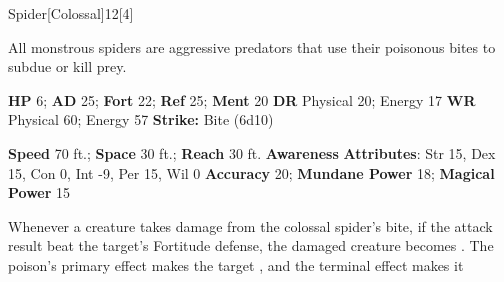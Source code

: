   
  \begin{monsection}{Spider}[Colossal]{12}[4]
    \vspace{-1em}\vspace{-1em}
    \vspace{0em}

    
    All monstrous spiders are aggressive predators that use their poisonous bites to subdue or kill prey.
  

    \begin{spellcontent}
      \begin{spelltargetinginfo}
        \pari \textbf{HP} 6;
          \textbf{AD} 25;
          \textbf{Fort} 22;
          \textbf{Ref} 25;
          \textbf{Ment} 20
        \pari \textbf{DR} Physical 20; Energy 17
        \pari \textbf{WR} Physical 60; Energy 57
        \pari \textbf{Strike:}
            Bite  (6d10)
      \end{spelltargetinginfo}
    \end{spellcontent}
    \begin{monsterfooter}
      \pari \textbf{Speed} 70 ft.;
        \textbf{Space} 30 ft.;
        \textbf{Reach} 30 ft.
      \pari \textbf{Awareness} 
      \pari \textbf{Attributes}:
        Str 15, Dex 15,
        Con 0, Int -9,
        Per 15, Wil 0
      \pari \textbf{Accuracy} 20;
        \textbf{Mundane Power} 18;
      \textbf{Magical Power} 15
    \end{monsterfooter}
  \end{monsection}
    Whenever a creature takes damage from the colossal spider's bite,
      if the attack result beat the target's Fortitude defense,
      the damaged creature becomes .
    The poison's primary effect makes the target , and the terminal effect makes it 
  

